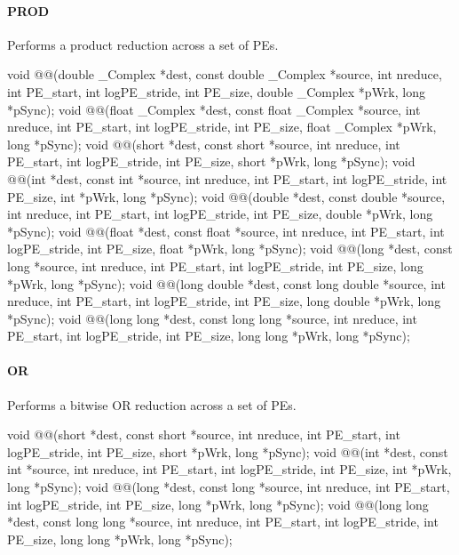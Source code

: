 \begin{apidefinition}
\paragraph{PROD}
Performs a product reduction across a set of \acp{PE}.\newline
\begin{Csynopsis}
void @@(double _Complex *dest, const double _Complex *source, int nreduce, int PE_start, int logPE_stride, int PE_size, double _Complex *pWrk, long *pSync);
void @@(float _Complex *dest, const float _Complex *source, int nreduce, int PE_start, int logPE_stride, int PE_size, float _Complex *pWrk, long *pSync);
void @@(short *dest, const short *source, int nreduce, int PE_start, int logPE_stride, int PE_size, short *pWrk, long *pSync);
void @@(int *dest, const int *source, int nreduce, int PE_start, int logPE_stride, int PE_size, int *pWrk, long *pSync);
void @@(double *dest, const double *source, int nreduce, int PE_start, int logPE_stride, int PE_size, double *pWrk, long *pSync);
void @@(float *dest, const float *source, int nreduce, int PE_start, int logPE_stride, int PE_size, float *pWrk, long *pSync);
void @@(long *dest, const long *source, int nreduce, int PE_start, int logPE_stride, int PE_size, long *pWrk, long *pSync);
void @@(long double *dest, const long double *source, int nreduce, int PE_start, int logPE_stride, int PE_size, long double *pWrk, long *pSync);
void @@(long long *dest, const long long *source, int nreduce, int PE_start, int logPE_stride, int PE_size, long long *pWrk, long *pSync);
\end{Csynopsis}

\paragraph{OR}
Performs a bitwise OR reduction across a set of \acp{PE}.\newline
\begin{Csynopsis}
void @@(short *dest, const short *source, int nreduce, int PE_start, int logPE_stride, int PE_size, short *pWrk, long *pSync);
void @@(int *dest, const int *source, int nreduce, int PE_start, int logPE_stride, int PE_size, int *pWrk, long *pSync);
void @@(long *dest, const long *source, int nreduce, int PE_start, int logPE_stride, int PE_size, long *pWrk, long *pSync);
void @@(long long *dest, const long long *source, int nreduce, int PE_start, int logPE_stride, int PE_size, long long *pWrk, long *pSync);
\end{Csynopsis}


\end{apidefinition}
